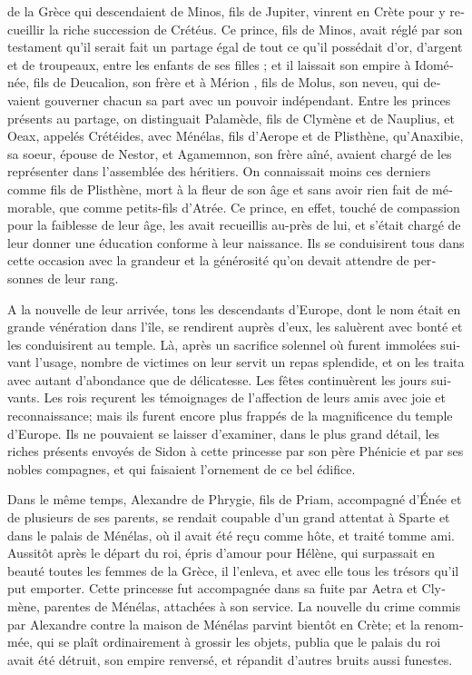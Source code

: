 \documentclass{article}
\begin{document}
\begin{pages}
\begin{Leftside}
\begin{french}
{{}} de la Grèce qui descendaient de Minos, fils de Jupiter, vinrent en Crète pour y recueillir la riche succession de Crétéus. Ce prince, fils de Minos, avait réglé par son testament qu'il serait fait un partage égal de tout ce qu'il possédait d'or, d'argent et de troupeaux, entre les enfants de ses filles ; et il laissait son empire à Idoménée, fils de Deucalion, son frère et à Mérion , fils de Molus, son neveu, qui devaient gouverner chacun sa part avec un pouvoir indépendant. Entre les princes présents au partage, on distinguait Palamède, fils de Clymène et de Nauplius, et Oeax, appelés Crétéides, avec Ménélas, fils d'Aerope et de Plisthène, qu'Anaxibie, sa soeur, épouse de Nestor, et Agamemnon, son frère aîné, avaient chargé de les représenter dans l'assemblée des héritiers. On connaissait moins ces derniers comme fils de Plisthène, mort à la fleur de son âge et sans avoir rien fait de mémorable, que comme petits-fils d'Atrée. Ce prince, en effet, touché de compassion pour la faiblesse de leur âge, les avait recueillis au-près de lui, et s'était chargé de leur donner une éducation conforme à leur naissance. Ils se conduisirent tous dans cette occasion avec la grandeur et la générosité qu'on devait attendre de personnes de leur rang.

A la nouvelle de leur arrivée, tons les descendants d'Europe, dont le nom était en grande vénération dans l'île, se rendirent auprès d'eux, les saluèrent avec bonté et les conduisirent au temple. Là, après un sacrifice solennel où furent immolées suivant l'usage, nombre de victimes on leur servit un repas splendide, et on les traita avec autant d'abondance que de délicatesse. Les fêtes continuèrent les jours suivants. Les rois reçurent les témoignages de l'affection de leurs amis avec joie et reconnaissance; mais ils furent encore plus frappés de la magnificence du temple d'Europe. Ils ne pouvaient se laisser d'examiner, dans le plus grand détail, les riches présents envoyés de Sidon à cette princesse par son père Phénicie  et par ses nobles compagnes, et qui faisaient l'ornement de ce bel édifice.

Dans le même temps, Alexandre de Phrygie, fils de Priam, accompagné d'Énée  et de plusieurs de ses parents, se rendait coupable d'un grand attentat à Sparte et dans le palais de Ménélas, où il avait été reçu comme hôte, et traité tomme ami. Aussitôt après le départ du roi, épris d'amour pour Hélène, qui surpassait en beauté toutes les femmes de la Grèce, il l'enleva, et avec elle tous les trésors qu'il put emporter. Cette princesse fut accompagnée dans sa fuite par Aetra et Clymène, parentes de Ménélas, attachées à son service. La nouvelle du crime commis par Alexandre contre la maison de Ménélas parvint bientôt en Crète; et la renommée, qui se plaît ordinairement à grossir les objets, publia que le palais du roi avait été détruit, son empire renversé, et répandit d'autres bruits aussi funestes.


\end{french}
\end{Leftside}
\end{pages}
\end{document}
